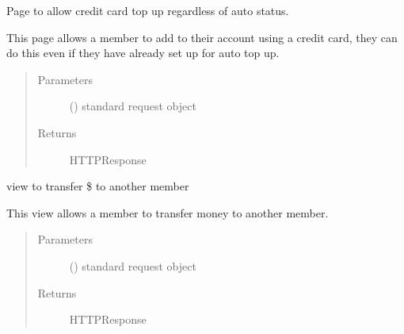\documentclass[letterpaper,10pt,english]{sphinxmanual}
\begin{document}
\begin{fulllineitems}
\label{\detokenize{payments:payments.views.manual_topup}}
Page to allow credit card top up regardless of auto status.

This page allows a member to add to their account using a credit card,
they can do this even if they have already set up for auto top up.
\begin{quote}\begin{description}
\item[{Parameters}] \leavevmode
{} () \textendash{} standard request object

\item[{Returns}] \leavevmode
HTTPResponse

\end{description}\end{quote}

\end{fulllineitems}


\begin{fulllineitems}
\label{\detokenize{payments:payments.views.member_transfer}}
view to transfer \$ to another member

This view allows a member to transfer money to another member.
\begin{quote}\begin{description}
\item[{Parameters}] \leavevmode
{} () \textendash{} standard request object

\item[{Returns}] \leavevmode
HTTPResponse

\end{description}\end{quote}

\end{fulllineitems}

\end{document}
